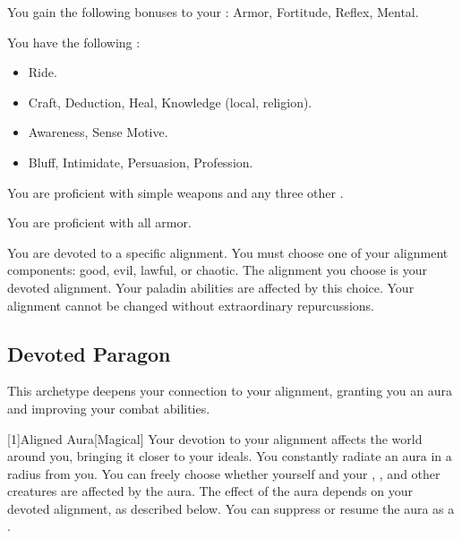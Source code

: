         You gain the following bonuses to your :  Armor,  Fortitude,  Reflex,  Mental.

        You have the following :
        \begin{itemize}
            \item {} Ride.
            \item {} Craft, Deduction, Heal, Knowledge (local, religion).
            \item {} Awareness, Sense Motive.
            \item {} Bluff, Intimidate, Persuasion, Profession.
        \end{itemize}

        You are proficient with simple weapons and any three other .

        You are proficient with all armor.

        You are devoted to a specific alignment.
        You must choose one of your alignment components: good, evil, lawful, or chaotic.
        The alignment you choose is your devoted alignment.
        Your paladin abilities are affected by this choice.
        Your alignment cannot be changed without extraordinary repurcussions.

    \subsection{Devoted Paragon}
        This archetype deepens your connection to your alignment, granting you an aura and improving your combat abilities.

        [1]{Aligned Aura}[Magical]
        Your devotion to your alignment affects the world around you, bringing it closer to your ideals.
        You constantly radiate an aura in a \areamed radius  from you.
        You can freely choose whether yourself and your , , and other creatures are affected by the aura.
        The effect of the aura depends on your devoted alignment, as described below.
        You can suppress or resume the aura as a .

